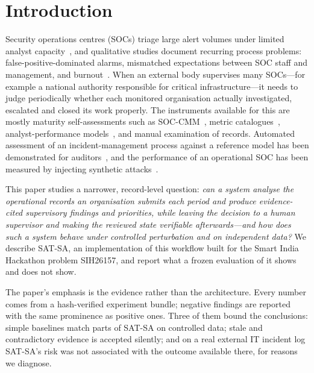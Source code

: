 \section{Introduction}
\label{sec:intro}

Security operations centres (SOCs) triage large alert volumes under limited analyst
capacity~\cite{vielberth2020soc,tariq2025alertfatigue}, and qualitative studies
document recurring process problems: false-positive-dominated alarms, mismatched
expectations between SOC staff and management, and burnout~\cite{alahmadi2022falsepositives,kokulu2019soc,sundaramurthy2015burnout}.
When an external body supervises many SOCs---for example a national authority
responsible for critical infrastructure---it needs to judge periodically whether
each monitored organisation actually investigated, escalated and closed its work
properly. The instruments available for this are mostly maturity self-assessments
such as SOC-CMM~\cite{vanos2016soccmm}, metric catalogues~\cite{forsberg2023metrics},
analyst-performance models~\cite{agyepong2023analyst}, and manual examination of
records. Automated assessment of an incident-management process against a reference
model has been demonstrated for auditors~\cite{palma2024compliance}, and the
performance of an operational SOC has been measured by injecting synthetic
attacks~\cite{rosso2020saibersoc}.

This paper studies a narrower, record-level question: \emph{can a system analyse
the operational records an organisation submits each period and produce
evidence-cited supervisory findings and priorities, while leaving the decision
to a human supervisor and making the reviewed state verifiable afterwards---and
how does such a system behave under controlled perturbation and on independent
data?} We describe SAT-SA, an implementation of this workflow built for the Smart
India Hackathon problem SIH26157, and report what a frozen evaluation of it shows
and does not show.

The paper's emphasis is the evidence rather than the architecture. Every number
comes from a hash-verified experiment bundle; negative findings are reported with
the same prominence as positive ones. Three of them bound the conclusions:
simple baselines match parts of SAT-SA on controlled data; stale and contradictory
evidence is accepted silently; and on a real external IT incident log SAT-SA's risk
was not associated with the outcome available there, for reasons we diagnose.

